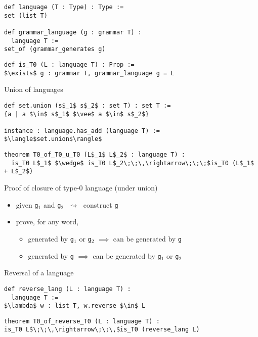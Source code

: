\documentclass{beamer}
\begin{document}
	\begin{frame}[fragile]{\only<2->{Type-0 languages}}
\begin{lstlisting}
def language (T : Type) : Type :=
set (list T)

def grammar_language (g : grammar T) :
  language T :=
set_of (grammar_generates g)
\end{lstlisting}
\pause
\begin{lstlisting}
def is_T0 (L : language T) : Prop :=
$\exists$ g : grammar T, grammar_language g = L
\end{lstlisting}
	\end{frame}
	
	\begin{frame}[fragile]{Union of languages}
\begin{lstlisting}
def set.union (s$_1$ s$_2$ : set T) : set T :=
{a | a $\in$ s$_1$ $\vee$ a $\in$ s$_2$}

instance : language.has_add (language T) :=
$\langle$set.union$\rangle$
\end{lstlisting}
\pause
\begin{lstlisting}
theorem T0_of_T0_u_T0 (L$_1$ L$_2$ : language T) :
  is_T0 L$_1$ $\wedge$ is_T0 L$_2\;\;\,\rightarrow\;\;\;$is_T0 (L$_1$ + L$_2$)
\end{lstlisting}
	\end{frame}
	
	\begin{frame}{Proof of closure of type-0 language (under union)}
		\begin{itemize}
			\item given \texttt{g$_1$} and \texttt{g$_2$} $\;\rightsquigarrow\;$ construct \texttt{g}
			\pause
			\item prove, for any word,
			\begin{itemize}
				\item generated by \texttt{g$_1$} or \texttt{g$_2$} $\implies$ can be generated by \texttt{g}
				\pause
				\item generated by \texttt{g} $\implies$ can be generated by \texttt{g$_1$} or \texttt{g$_2$}
			\end{itemize}
		\end{itemize}
	\end{frame}
	
	\begin{frame}[fragile]{Reversal of a language}
\begin{lstlisting}
def reverse_lang (L : language T) :
  language T :=
$\lambda$ w : list T, w.reverse $\in$ L
\end{lstlisting}
\pause
\begin{lstlisting}
theorem T0_of_reverse_T0 (L : language T) :
is_T0 L$\;\;\,\rightarrow\;\;\,$is_T0 (reverse_lang L)
\end{lstlisting}
	\end{frame}
	
\end{document}
